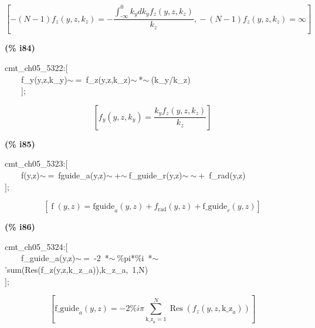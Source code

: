 \documentclass[fleqn]{article}
\begin{document}
\[\tag{\% o83} 
\left[ -\left( N-1\right)  {f_z}\left( y\operatorname{,}z\operatorname{,}{k_z}\right) =-\frac{\int_{\operatorname{-}\infty }^{0}{\left. {k_y}d{k_y}\right.} {f_z}\left( y\operatorname{,}z\operatorname{,}{k_z}\right) }{{k_z}}\operatorname{,}-\left( N-1\right)  {f_z}\left( y\operatorname{,}z\operatorname{,}{k_z}\right) =\infty \right] \mbox{}
\]


\noindent
\begin{minipage}[t]{4.000000em}\color{red}\bfseries
(\% i84)	
\end{minipage}
\begin{minipage}[t]{\textwidth}\color{blue}
cmt\_ch05\_5322:[\\
\ \ \ \ f\_y(y,z,k\_y)\ensuremath{\sim\ }=\ f\_z(y,z,k\_z)\ensuremath{\sim\ }*\ensuremath{\sim\ }(k\_y/k\_z)\\
\ \ \ \ ];
\end{minipage}
\[\displaystyle \tag{\% o84} 
\left[ {f_y}\left( y\operatorname{,}z\operatorname{,}{k_y}\right) =\frac{{k_y} {f_z}\left( y\operatorname{,}z\operatorname{,}{k_z}\right) }{{k_z}}\right] \mbox{}
\]


\noindent
\begin{minipage}[t]{4.000000em}\color{red}\bfseries
(\% i85)	
\end{minipage}
\begin{minipage}[t]{\textwidth}\color{blue}
cmt\_ch05\_5323:[\\
\ \ \ \ f(y,z)\ensuremath{\sim\ }=\ fguide\_a(y,z)\ensuremath{\sim\ }+\ensuremath{\sim\ }f\_guide\_r(y,z)\ensuremath{\sim\ }\ensuremath{\sim\ }+\ f\_rad(y,z)\\
];
\end{minipage}
\[\displaystyle \tag{\% o85} 
\left[ \operatorname{f}\left( y\operatorname{,}z\right) ={{\ensuremath{\mathrm{fguide}}}_a}\left( y\operatorname{,}z\right) +{f_{\ensuremath{\mathrm{rad}}}}\left( y\operatorname{,}z\right) +{{\ensuremath{\mathrm{f\_ guide}}}_r}\left( y\operatorname{,}z\right) \right] \mbox{}
\]


\noindent
\begin{minipage}[t]{4.000000em}\color{red}\bfseries
(\% i86)	
\end{minipage}
\begin{minipage}[t]{\textwidth}\color{blue}
cmt\_ch05\_5324:[\\
\ \ \ \ f\_guide\_a(y,z)\ensuremath{\sim\ }=\ -2\ *\ensuremath{\sim\ }\%pi*\%i\ *\ensuremath{\sim\ }'sum(Res(f\_z(y,z,k\_z\_a)),k\_z\_a,\ 1,N)\\
];
\end{minipage}
\[\displaystyle \tag{\% o86} 
\left[ {{\ensuremath{\mathrm{f\_ guide}}}_a}\left( y\operatorname{,}z\right) =-2 \% i \ensuremath{\pi}  \sum_{{{\ensuremath{\mathrm{k\_ z}}}_a}=1}^{N}{\left. \operatorname{Res}\left( {f_z}\left( y\operatorname{,}z\operatorname{,}{{\ensuremath{\mathrm{k\_ z}}}_a}\right) \right) \right.}\right] \mbox{}
\]
\end{document}
